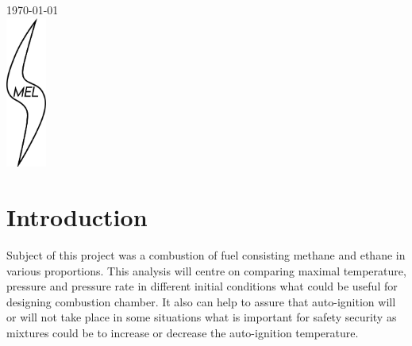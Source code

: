 \begin{titlepage}
			
			
			{\large \today}\\[1.5cm] %
			
			
			\includegraphics[width=0.1\textwidth]{latex/logo.png}\\[0.5cm] %
			
			
			\vfill %
			
		\end{titlepage}
		
		
		
		
		\section{Introduction}
		Subject of this project was a combustion of fuel consisting methane and ethane in various proportions. This analysis will centre on comparing maximal temperature, pressure and pressure rate in different initial conditions what could be useful for designing combustion chamber. It also can help to assure that auto-ignition will or will not take place in some situations what is important for safety security as mixtures could be to increase or decrease the auto-ignition temperature.
		
